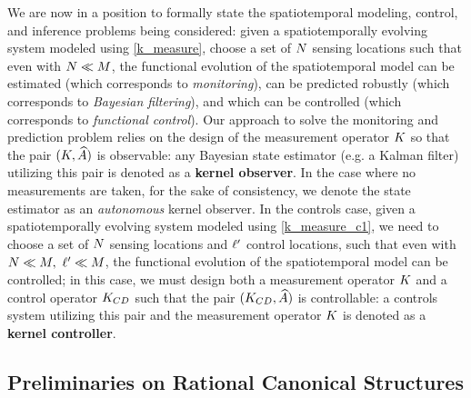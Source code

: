We are now in a position to formally state the spatiotemporal modeling, control, and inference problems being considered: given a spatiotemporally evolving system modeled using \eqref{k_measure}, choose a set of $N$ sensing locations such that even with $N\ll M$, the functional evolution of the spatiotemporal model can be estimated (which corresponds to \emph{monitoring}), can be predicted robustly (which corresponds to \emph{Bayesian filtering}), and which can be controlled (which corresponds to \emph{functional control}). Our approach to solve the monitoring and prediction problem relies on the design of the measurement operator $K$ so that the pair $(K, \widehat{A})$ is observable: any Bayesian state estimator (e.g. a Kalman filter) utilizing this pair is denoted as a \textbf{kernel observer}. In the case where no measurements are taken, for the sake of consistency, we denote the state estimator as an \textit{autonomous} kernel observer. In the controls case, given a spatiotemporally evolving system modeled using \eqref{k_measure_c1}, we need to choose a set of $N$ sensing locations and $\ell'$ control locations, such that even with $N\ll M, \ \ell' \ll M$, the functional evolution of the spatiotemporal model can be controlled; in this case, we must design both a measurement operator $K$ and a control operator $K_{CD}$ such that the pair $(K_{CD}, \widehat{A})$ is controllable: a controls system utilizing this pair and the measurement operator $K$ is denoted as a \textbf{kernel controller}.


\subsection{Preliminaries on Rational Canonical Structures}\label{sec_prelim}

